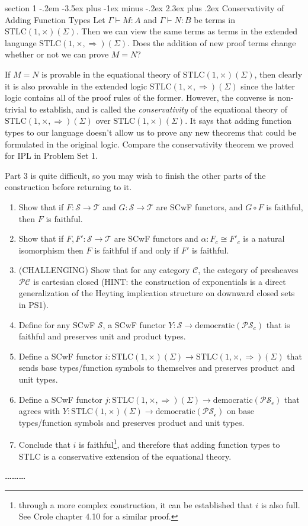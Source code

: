 \documentclass[12pt]{article}
\makeatletter
\newenvironment{problem}{\@startsection
       {section}
       {1}
       {-.2em}
       {-3.5ex plus -1ex minus -.2ex}
       {2.3ex plus .2ex}
       {\pagebreak[3]%
       \large\bf\noindent{Problem }
       }
       }
       {%
       \begin{center}\large\bf \ldots\ldots\ldots\end{center}}
\newcommand{\cat}{\mathcal}
\newcommand{\stlccart}{\mathrm{STLC}(1,\times)}
\newcommand{\stlcccc}{\mathrm{STLC}(1,\times,\Rightarrow)}
\makeatother
\begin{document}
\begin{problem}{Conservativity of Adding Function Types}
  Let $\Gamma \vdash M : A$ and $\Gamma \vdash N : B$ be terms in
  $\stlccart(\Sigma)$. Then we can view the same terms as terms
  in the extended language $\stlcccc(\Sigma)$. Does
  the addition of new proof terms change whether or not we can prove
  $M = N$?

  If $M = N$ is provable in the equational theory of
  $\stlccart(\Sigma)$, then clearly it is also provable in the
  extended logic $\stlcccc(\Sigma)$ since the latter logic contains
  all of the proof rules of the former. However, the converse is
  non-trivial to establish, and is called the \emph{conservativity} of
  the equational theory of $\stlcccc(\Sigma)$ over
  $\stlccart(\Sigma)$. It says that adding function types to our
  language doesn't allow us to prove any new theorems that could be
  formulated in the original logic. Compare the conservativity theorem
  we proved for IPL in Problem Set 1.

  Part 3 is quite difficult, so you may wish to finish the other parts
  of the construction before returning to it.
  \begin{enumerate}
  \item Show that if $F : \cat S \to \cat T$ and $G : \cat S \to \cat
    T$ are SCwF functors, and $G \circ F$ is faithful, then $F$ is
    faithful.
  \item Show that if $F, F' : \cat S \to \cat T$ are SCwF functors and
    $\alpha : F_c \cong F'_c$ is a natural isomorphism then $F$ is
    faithful if and only if $F'$ is faithful.
  \item (CHALLENGING) Show that for any category $\cat C$, the category of
    presheaves $\mathcal P\cat C$ is cartesian closed (HINT: the
    construction of exponentials is a direct generalization of the
    Heyting implication structure on downward closed sets in PS1).
  \item Define for any SCwF $\cat S$, a SCwF functor $Y : \cat S \to
    \textrm{democratic}(\mathcal P\cat S_c)$ that is faithful and
    preserves unit and product types.
  \item Define a SCwF functor $i : \stlccart(\Sigma) \to
    \stlcccc(\Sigma)$ that sends base types/function symbols to
    themselves and preserves product and unit types.
  \item Define a SCwF functor $j : \stlcccc(\Sigma) \to
    \textrm{democratic}(\mathcal P\cat {S_c})$ that agrees with $Y :
    \stlccart(\Sigma) \to \textrm{democratic}(\mathcal P\cat {S_c})$
    on base types/function symbols and preserves product and unit
    types.

  \item Conclude that $i$ is faithful\footnote{through a more complex
  construction, it can be established that $i$ is also full. See Crole
  chapter 4.10 for a similar proof.}, and therefore that adding
    function types to STLC is a conservative extension of the
    equational theory.
  \end{enumerate}
\end{problem}
\end{document}
